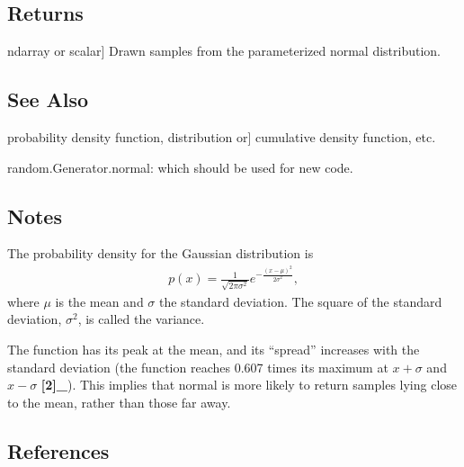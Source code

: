 \documentclass[letterpaper,10pt,english]{sphinxmanual}
\begin{document}
\begin{fulllineitems}
\begin{description}
\end{description}


\subsection{Returns}
\label{\detokenize{myfpga:id16}}\begin{description}
\sphinxlineitem{out}{[}ndarray or scalar{]}
\sphinxAtStartPar
Drawn samples from the parameterized normal distribution.

\end{description}


\subsection{See Also}
\label{\detokenize{myfpga:id17}}\begin{description}
\sphinxlineitem{scipy.stats.norm}{[}probability density function, distribution or{]}
\sphinxAtStartPar
cumulative density function, etc.

\end{description}

\sphinxAtStartPar
random.Generator.normal: which should be used for new code.


\subsection{Notes}
\label{\detokenize{myfpga:id18}}
\sphinxAtStartPar
The probability density for the Gaussian distribution is
\begin{equation*}
\begin{split}p(x) = \frac{1}{\sqrt{ 2 \pi \sigma^2 }}
e^{ - \frac{ (x - \mu)^2 } {2 \sigma^2} },\end{split}
\end{equation*}
\sphinxAtStartPar
where \(\mu\) is the mean and \(\sigma\) the standard
deviation. The square of the standard deviation, \(\sigma^2\),
is called the variance.

\sphinxAtStartPar
The function has its peak at the mean, and its “spread” increases with
the standard deviation (the function reaches 0.607 times its maximum at
\(x + \sigma\) and \(x - \sigma\) {\color{red}\bfseries{}{[}2{]}\_}).  This implies that
normal is more likely to return samples lying close to the mean, rather
than those far away.


\subsection{References}
\label{\detokenize{myfpga:id20}}


\end{fulllineitems}
\end{document}

